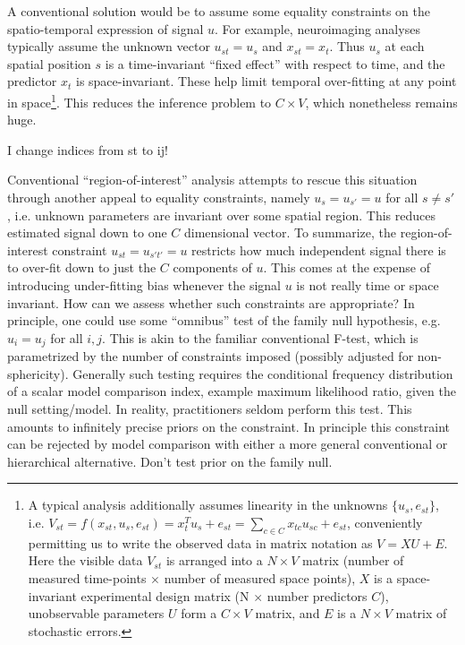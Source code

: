 \documentclass{article}
\begin{document}
A conventional solution would be to assume some equality constraints on the spatio-temporal expression of signal $u$. For example, neuroimaging analyses typically assume the unknown vector $u_{st}=u_s$ and $x_{st}=x_t$. Thus $u_s$ at each spatial position $s$ is a time-invariant ``fixed effect'' with respect to time, and  the predictor $x_t$ is space-invariant. These help limit temporal over-fitting at any point in space\footnote{A typical analysis additionally assumes linearity in the unknowns $\{u_s,e_{st}\}$, i.e.  $V_{st}= f(x_{st},u_{s}, e_{st}) = x_{t}^Tu_{s} + e_{st} = \sum_{c \in C} x_{tc}u_{sc} + e_{st}$, conveniently permitting us to write the observed data in matrix notation as $V=XU+E$. Here the visible data $V_{st}$ is arranged into a $N \times V$ matrix (number of measured time-points $\times$ number of measured space points), $X$ is a space-invariant experimental design matrix (N $\times$ number predictors $C$), unobservable parameters $U$ form a $C \times V$  matrix, and $E$ is a $N \times V$ matrix of stochastic errors.}. This reduces the inference problem to $C \times V$, which nonetheless remains huge.  

I change indices from st to ij!

Conventional ``region-of-interest'' analysis attempts to rescue this situation through another appeal to equality constraints, namely $u_{s}=u_{s'}=u$ for all $s \neq s'$, i.e. unknown parameters are invariant over some spatial region. This reduces estimated signal down to one $C$ dimensional vector. To summarize, the region-of-interest constraint $u_{st}=u_{s't'}=u$ restricts how much independent signal there is to over-fit down to just the $C$ components of $u$. This comes at the expense of introducing under-fitting bias whenever the signal $u$ is not really time or space invariant. How can we assess whether such constraints are appropriate? In principle, one could use some ``omnibus'' test of the family null hypothesis, e.g. $u_i=u_j$ for all $i,j$. This is akin to the familiar conventional F-test, which is parametrized by the number of constraints imposed (possibly adjusted for non-sphericity). Generally such testing requires the conditional frequency distribution of a scalar model comparison index, example maximum likelihood ratio, given the null setting/model. In reality, practitioners seldom perform this test. This amounts to infinitely precise priors on the constraint. In principle this constraint can be rejected by model comparison with either a more general conventional or hierarchical alternative. Don't test prior on the family null. 
\end{document}
